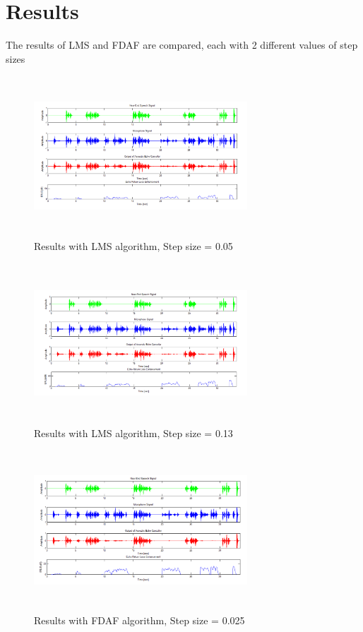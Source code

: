 \documentclass[conference]{IEEEtran}
\begin{document}
\section{Results}
The results of LMS and FDAF are compared, each with 2 different values of step sizes
	\begin{figure}
		\includegraphics[height=6cm, width=8cm]{LMS_Result_5e-2}
		\caption{Results with LMS algorithm, Step size = 0.05}
	\end{figure}
	
	\begin{figure}
		\includegraphics[height=6cm, width=8cm]{LMS_Result_13e-2}
		\caption{Results with LMS algorithm, Step size = 0.13}
	\end{figure}
	
	\begin{figure}
		\includegraphics[height=6cm, width=8cm]{FDAF_Result}
		\caption{Results with FDAF algorithm, Step size = 0.025}
	\end{figure}
\end{document}
